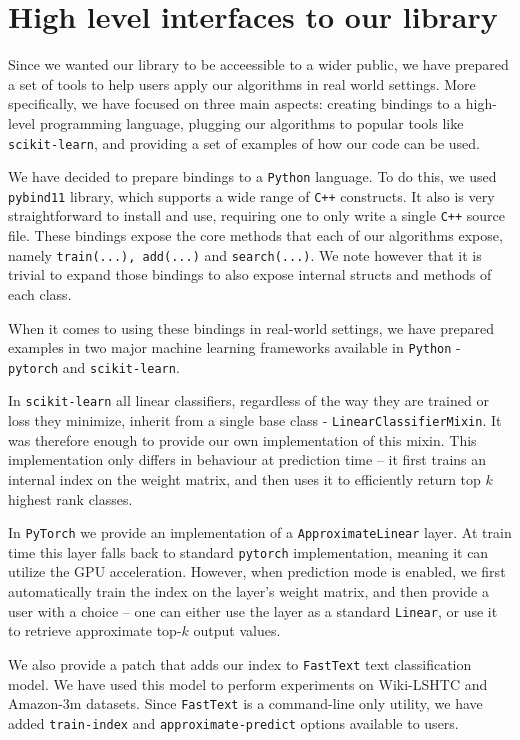 \section{High level interfaces to our library}

    Since we wanted our library to be acceessible to a wider public, we have prepared
    a set of tools to help users apply our algorithms in real world settings. More specifically,
    we have focused on three main aspects: creating bindings to a high-level programming language,
    plugging our algorithms to popular tools like \texttt{scikit-learn}, and providing a set
    of examples of how our code can be used.

    We have decided to prepare bindings to a \texttt{Python} language. To do this, we used
    \texttt{pybind11}\cite{pybind11} library, which supports a wide range of \texttt{C++}
    constructs. It also is very straightforward to install and use, requiring one to only
    write a single \texttt{C++} source file. These bindings expose the core methods that
    each of our algorithms expose, namely \texttt{train(...), add(...)} and \texttt{search(...)}.
    We note however that it is trivial to expand those bindings to also expose internal
    structs and methods of each class.

    When it comes to using these bindings in real-world settings, we have prepared examples
    in two major machine learning frameworks available in \texttt{Python} - \texttt{pytorch}
    and \texttt{scikit-learn}.

    In \texttt{scikit-learn} all linear classifiers, regardless of the way they are trained
    or loss they minimize, inherit from a single base class - \texttt{LinearClassifierMixin}.
    It was therefore enough to provide our own implementation of this mixin. This implementation
    only differs in behaviour at prediction time -- it first trains an internal index on the
    weight matrix, and then uses it to efficiently return top $k$ highest rank classes.

    In \texttt{PyTorch} we provide an implementation of a \texttt{ApproximateLinear} layer.
    At train time this layer falls back to standard \texttt{pytorch} implementation, meaning
    it can utilize the GPU acceleration. However, when prediction mode is enabled, we first
    automatically train the index on the layer's weight matrix, and then provide a user with
    a choice -- one can either use the layer as a standard \texttt{Linear}, or use it
    to retrieve approximate top-$k$ output values.

    We also provide a patch that adds our index to \texttt{FastText} text classification model.
    We have used this model to perform experiments on Wiki-LSHTC and Amazon-3m datasets.
    Since \texttt{FastText} is a command-line only utility, we have added \texttt{train-index} and
    \texttt{approximate-predict} options available to users.
